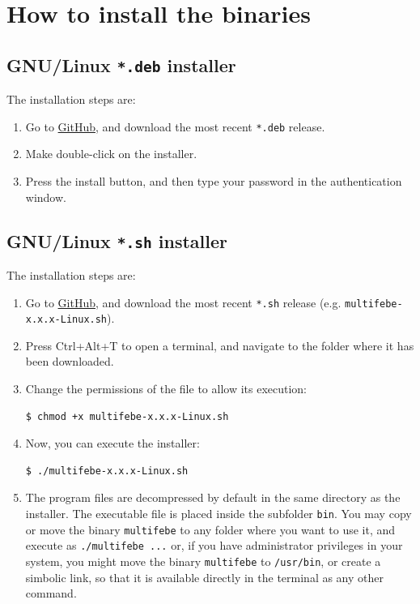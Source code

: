 \documentclass[a4paper,fleqn]{book}
\begin{document}
\section{How to install the binaries}

\subsection{GNU/Linux \texttt{*.deb} installer}

\label{subsec:deb}

The installation steps are:
\begin{enumerate}
    \item Go to \href{https://github.com/mmc-siani-es/MultiFEBE/releases}{GitHub}, and download the most recent \texttt{*.deb} release.
    \item Make double-click on the installer.
    \item Press the install button, and then type your password in the authentication window.   
\end{enumerate}

\subsection{GNU/Linux \texttt{*.sh} installer}

The installation steps are:
\begin{enumerate}
    \item Go to \href{https://github.com/mmc-siani-es/MultiFEBE/releases}{GitHub}, and download the most recent \texttt{*.sh} release (e.g. \texttt{multifebe-x.x.x-Linux.sh}).
    \item Press Ctrl+Alt+T to open a terminal, and navigate to the folder where it has been downloaded.
    \item Change the permissions of the file to allow its execution:
\begin{Verbatim}[frame=single, fontsize=\small]
$ chmod +x multifebe-x.x.x-Linux.sh
\end{Verbatim}
    \item Now, you can execute the installer:
\begin{Verbatim}[frame=single, fontsize=\small]
$ ./multifebe-x.x.x-Linux.sh
\end{Verbatim}
    \item The program files are decompressed by default in the same directory as the installer. The executable file is placed inside the subfolder \texttt{bin}. You may copy or move the binary \texttt{multifebe} to any folder where you want to use it, and execute as \verb!./!\texttt{multifebe ...} or, if you have administrator privileges in your system, you might move the binary \texttt{multifebe} to \texttt{/usr/bin}, or create a simbolic link, so that it is available directly in the terminal as any other command. 
\end{enumerate}
\end{document}
